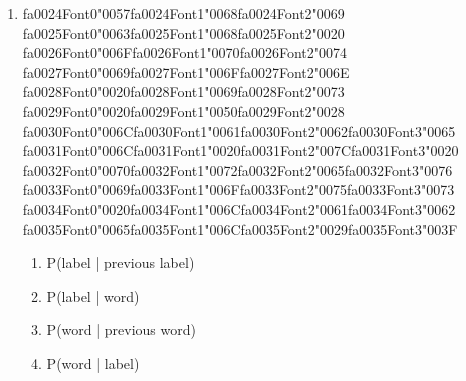 \documentclass[12pt]{article}
\begin{document}
\begin{enumerate}[label=Q\arabic*.]
\begin{enumerate}[label=(\Alph*)]
    \item It is identical to an HMM
    \item It models transitions between labels but does not consider the words
    \item It models emissions P(word | label)
\end{enumerate}
\item {\csname fa0024Font0\endcsname\char"0057}{\csname fa0024Font1\endcsname\char"0068}{\csname fa0024Font2\endcsname\char"0069} {\csname fa0025Font0\endcsname\char"0063}{\csname fa0025Font1\endcsname\char"0068}{\csname fa0025Font2\endcsname\char"0020} {\csname fa0026Font0\endcsname\char"006F}{\csname fa0026Font1\endcsname\char"0070}{\csname fa0026Font2\endcsname\char"0074} {\csname fa0027Font0\endcsname\char"0069}{\csname fa0027Font1\endcsname\char"006F}{\csname fa0027Font2\endcsname\char"006E} {\csname fa0028Font0\endcsname\char"0020}{\csname fa0028Font1\endcsname\char"0069}{\csname fa0028Font2\endcsname\char"0073} {\csname fa0029Font0\endcsname\char"0020}{\csname fa0029Font1\endcsname\char"0050}{\csname fa0029Font2\endcsname\char"0028} {\csname fa0030Font0\endcsname\char"006C}{\csname fa0030Font1\endcsname\char"0061}{\csname fa0030Font2\endcsname\char"0062}{\csname fa0030Font3\endcsname\char"0065} {\csname fa0031Font0\endcsname\char"006C}{\csname fa0031Font1\endcsname\char"0020}{\csname fa0031Font2\endcsname\char"007C}{\csname fa0031Font3\endcsname\char"0020} {\csname fa0032Font0\endcsname\char"0070}{\csname fa0032Font1\endcsname\char"0072}{\csname fa0032Font2\endcsname\char"0065}{\csname fa0032Font3\endcsname\char"0076} {\csname fa0033Font0\endcsname\char"0069}{\csname fa0033Font1\endcsname\char"006F}{\csname fa0033Font2\endcsname\char"0075}{\csname fa0033Font3\endcsname\char"0073} {\csname fa0034Font0\endcsname\char"0020}{\csname fa0034Font1\endcsname\char"006C}{\csname fa0034Font2\endcsname\char"0061}{\csname fa0034Font3\endcsname\char"0062} {\csname fa0035Font0\endcsname\char"0065}{\csname fa0035Font1\endcsname\char"006C}{\csname fa0035Font2\endcsname\char"0029}{\csname fa0035Font3\endcsname\char"003F}
\begin{enumerate}[label=(\Alph*)]
    \item P(label | previous label)
    \item P(label | word)
    \item P(word | previous word)
    \item P(word | label)
\end{enumerate}

\end{enumerate}
\end{document}
